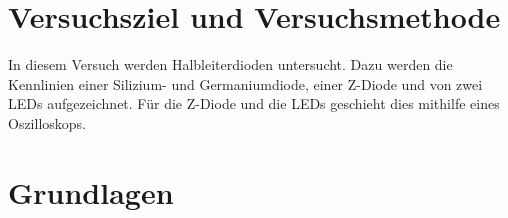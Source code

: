 \documentclass[
12pt,
a4paper,
bibliography=totocnumbered, %
BCOR=1cm, %
oneside, %
]{scrartcl}
\begin{document}
\thispagestyle{empty}



\thispagestyle{empty}

\tableofcontents

\clearpage %

\renewcommand{\thepage}{\arabic{page}}
\setcounter{page}{1}


\section[Versuchsziel]{Versuchsziel und Versuchsmethode}

In diesem Versuch werden Halbleiterdioden untersucht. Dazu werden die Kennlinien einer Silizium- und Germaniumdiode, einer Z-Diode und von zwei LEDs aufgezeichnet. Für die Z-Diode und die LEDs geschieht dies mithilfe eines Oszilloskops.

\section{Grundlagen}
\end{document}
